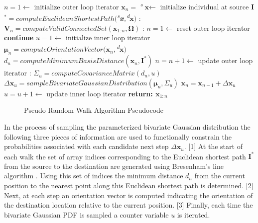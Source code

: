                 \begin{algorithm}
                \caption{}\label{euclid}
                \begin{algorithmic}[1]
                \State $n = 1 \gets$ initialize outer loop iterator
                \State $\textbf{x}_n =$ \textsuperscript{\textit{s}}$\textbf{x} \gets$ initialize individual at source
                \State \textbf{I}$^{*} = computeEuclideanShortestPath($\textsuperscript{\textit{s}}$\textbf{\textit{x}},$\textsuperscript{\textit{d}}$\textbf{x})$
                :
                \State $\textbf{V}_n = computeValidConnectedSet(\textbf{x}_{1:n},\boldsymbol\Omega)$
                :
                \State $n = 1 \gets$ reset outer loop iterator
                \State \textbf{continue}
                \EndIf
                \State $u = 1 \gets$ initialize inner loop iterator
                \State $\boldsymbol{\mu}_n = computeOrientationVector(\textbf{x}_n,$\textsuperscript{\textit{d}}$\textbf{x})$
                \State $d_n = computeMinimumBasisDistance(\textbf{x}_{n},\textbf{I}^{*})$
                \State $n = n + 1 \gets$ update outer loop iterator
                :
                \State $\Sigma_u = computeCovarianceMatrix(d_n,u)$
                \State $\Delta\textbf{x}_u = sampleBivariateGaussianDistribution(\boldsymbol\mu_n,\Sigma_u)$
                \State $\textbf{x}_{n} = \textbf{x}_{n-1} + \Delta\textbf{x}_{u}$
                \State $u = u + 1 \gets$ update inner loop iterator
                \EndWhile {}
                \EndWhile {}
                \State \textbf{return: $\textbf{x}_{1:n}$}
                \EndProcedure
                \end{algorithmic}
                \end{algorithm}
                
            \begin{figure}[Pseudo-Random Walk Algorithm Pseudocode]
            \caption[Pseudo-Random Walk Algorithm Pseudocode]{Pseudo-Random Walk Algorithm Pseudocode}
            \label{fig:pseudo-random-walk-pseudocode}
            \end{figure}
            
In the process of sampling the parameterized bivariate Gaussian distribution the following three pieces of information are used to functionally constrain the probabilities associated with each candidate next step $\Delta\textbf{x}_u$. [1] At the start of each walk the set of array indices corresponding to the Euclidean shortest path $\textbf{I}^*$ from the source to the destination are generated using Bresenham's line algorithm \cite{Bresenham1977}. Using this set of indices the minimum distance $d_n$ from the current position to the nearest point along this Euclidean shortest path is determined. [2] Next, at each step an orientation vector is computed indicating the orientation of the destination location relative to the current position. [3] Finally, each time the bivariate Gaussian PDF is sampled a counter variable $u$ is iterated. 

